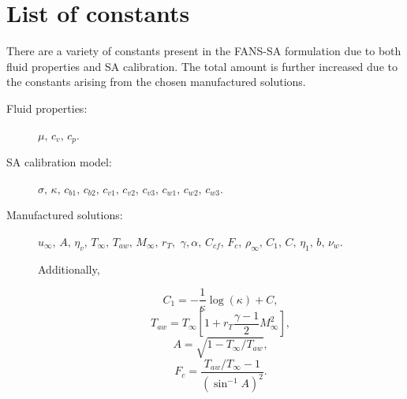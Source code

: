 \section{List of constants}

There are a variety of constants present in the FANS-SA formulation due to both fluid properties and SA calibration. The total amount is further increased due to the constants arising from the chosen manufactured solutions.

\begin{description}
	\item[Fluid properties:] $\mu, \,c_v, \, c_p$.

\item[SA calibration model:] $\sigma, \, \kappa, \, c_{b1}, \, c_{b2}, \, c_{v1}, \, c_{v2}, \, c_{v3}, \, c_{w1}, \, c_{w2}, \, c_{w3}$.

\item[Manufactured solutions:] $u_\infty, \, A, \, \eta_v, \, T_\infty, \, T_{aw},\, M_\infty, \, r_T,$  $\gamma, %
\alpha, \, C_{cf}, \, F_c, \, \rho_\infty, \, C_1, \, C,\, \eta_1, \, b, \, \nu_w$.

Additionally, 


$$C_1=-\dfrac{1}{\kappa} \log(\kappa)+C,$$%
$$T_{aw} =  T_{\infty} \left[ 1 + r_T \frac{\gamma - 1}{2} M_{\infty}^2 \right],$$
$$A = \sqrt{1 - T_{\infty}/T_{aw}},$$
$$ F_c = \frac{T_{aw}/T_{\infty} - 1}{ \left( \sin^{-1} A \right)^2} .$$
\end{description}
